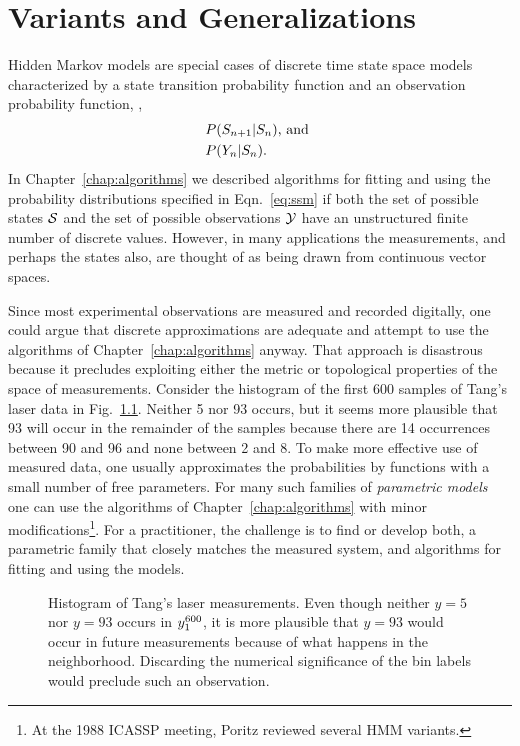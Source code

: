 \chapter{Variants and Generalizations}
\label{chap:variants}

Hidden Markov models are special cases of discrete time state space
models characterized by a state transition probability function and an
observation probability function, \ie,
\begin{subequations}
  \label{eq:ssm}
  \begin{align}
      &P(S_{n+1}|S_n)\text{, and }\\
      &P(Y_n|S_n).
  \end{align}
\end{subequations}
In Chapter~\ref{chap:algorithms} we described algorithms for fitting
and using the probability distributions specified in
Eqn.~\eqref{eq:ssm} if both the set of possible states $\states$ and
the set of possible observations $\outputs$ have an unstructured
finite number of discrete values.  However, in many applications the
measurements, and perhaps the states also, are thought of as being
drawn from continuous vector spaces.

Since most experimental observations are measured and recorded
digitally, one could argue that discrete approximations are adequate
and attempt to use the algorithms of Chapter~\ref{chap:algorithms}
anyway.  That approach is disastrous because it precludes exploiting
either the metric or topological properties of the space of
measurements.  Consider the histogram of the first 600 samples of
Tang's laser data in Fig.~\ref{fig:LaserHist}.  Neither 5 nor 93
occurs, but it seems more plausible that 93 will occur in the
remainder of the samples because there are 14 occurrences between 90
and 96 and none between 2 and 8.  To make more effective use of
measured data, one usually approximates the probabilities by functions
with a small number of free parameters.  For many such families of
\emph{parametric models} one can use the algorithms of
Chapter~\ref{chap:algorithms} with minor modifications\footnote{At the
  1988 ICASSP meeting, Poritz\cite{Poritz88} reviewed several HMM
  variants.}.  For a practitioner, the challenge is to find or develop
both, a parametric family that closely matches the measured system,
and algorithms for fitting and using the models.

\begin{figure}[htbp]
  \centering{\plotsize%
    }
  \caption[Histogram of Tang's laser measurements.]%
  {Histogram of Tang's laser measurements.  Even though neither $y=5$
    nor $y=93$ occurs in $y_{1}^{600}$, it is more plausible that
    $y=93$ would occur in future measurements because of what happens
    in the neighborhood.  Discarding the numerical significance of the
    bin labels would preclude such an observation. }
  \label{fig:LaserHist}
\end{figure}

